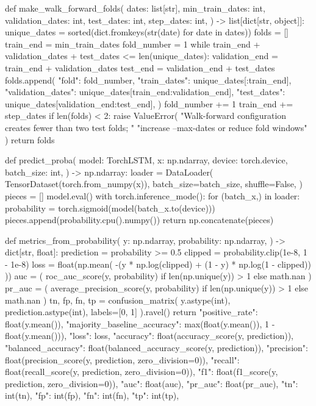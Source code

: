 \documentclass[UTF8,a4paper,fontset=fandol]{ctexart}
\begin{document}
\begin{ProjectCode}
def make_walk_forward_folds(
    dates: list[str],
    min_train_dates: int,
    validation_dates: int,
    test_dates: int,
    step_dates: int,
) -> list[dict[str, object]]:
    unique_dates = sorted(dict.fromkeys(str(date) for date in dates))
    folds = []
    train_end = min_train_dates
    fold_number = 1
    while train_end + validation_dates + test_dates <= len(unique_dates):
        validation_end = train_end + validation_dates
        test_end = validation_end + test_dates
        folds.append({
            "fold": fold_number,
            "train_dates": unique_dates[:train_end],
            "validation_dates": unique_dates[train_end:validation_end],
            "test_dates": unique_dates[validation_end:test_end],
        })
        fold_number += 1
        train_end += step_dates
    if len(folds) < 2:
        raise ValueError(
            "Walk-forward configuration creates fewer than two test folds; "
            "increase --max-dates or reduce fold windows"
        )
    return folds


def predict_proba(
    model: TorchLSTM,
    x: np.ndarray,
    device: torch.device,
    batch_size: int,
) -> np.ndarray:
    loader = DataLoader(
        TensorDataset(torch.from_numpy(x)),
        batch_size=batch_size,
        shuffle=False,
    )
    pieces = []
    model.eval()
    with torch.inference_mode():
        for (batch_x,) in loader:
            probability = torch.sigmoid(model(batch_x.to(device)))
            pieces.append(probability.cpu().numpy())
    return np.concatenate(pieces)


def metrics_from_probability(
    y: np.ndarray,
    probability: np.ndarray,
) -> dict[str, float]:
    prediction = probability >= 0.5
    clipped = probability.clip(1e-8, 1 - 1e-8)
    loss = float(np.mean(
        -(y * np.log(clipped) + (1 - y) * np.log(1 - clipped))
    ))
    auc = (
        roc_auc_score(y, probability)
        if len(np.unique(y)) > 1
        else math.nan
    )
    pr_auc = (
        average_precision_score(y, probability)
        if len(np.unique(y)) > 1
        else math.nan
    )
    tn, fp, fn, tp = confusion_matrix(
        y.astype(int), prediction.astype(int), labels=[0, 1]
    ).ravel()
    return {
        "positive_rate": float(y.mean()),
        "majority_baseline_accuracy": max(float(y.mean()), 1 - float(y.mean())),
        "loss": loss,
        "accuracy": float(accuracy_score(y, prediction)),
        "balanced_accuracy": float(balanced_accuracy_score(y, prediction)),
        "precision": float(precision_score(y, prediction, zero_division=0)),
        "recall": float(recall_score(y, prediction, zero_division=0)),
        "f1": float(f1_score(y, prediction, zero_division=0)),
        "auc": float(auc),
        "pr_auc": float(pr_auc),
        "tn": int(tn),
        "fp": int(fp),
        "fn": int(fn),
        "tp": int(tp),
    }



\end{ProjectCode}
\end{document}
